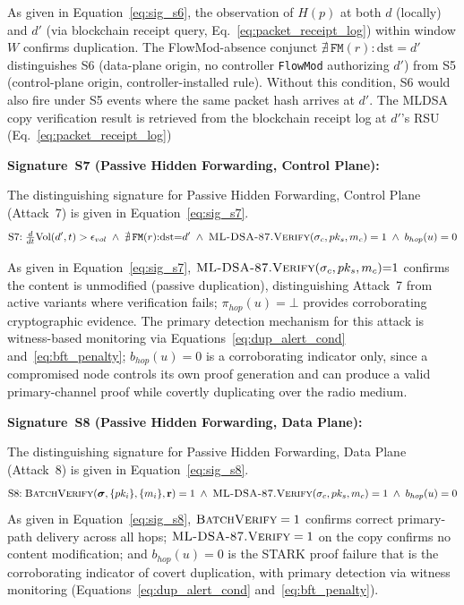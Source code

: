 \documentclass[12pt, a4paper]{report}
\begin{document}
As given in Equation~\eqref{eq:sig_s6}, the
observation of $H(p)$ at both $d$ (locally) and $d'$
(via blockchain receipt query,
Eq.~\ref{eq:packet_receipt_log}) within window $W$
confirms duplication. The \ac{FlowMod}-absence
conjunct $\nexists\,\texttt{FM}(r){:}\text{dst}{=}d'$
distinguishes S6 (data-plane origin, no controller
\texttt{FlowMod} authorizing $d'$) from S5
(control-plane origin, controller-installed rule).
Without this condition, S6 would also fire under S5
events where the same packet hash arrives at $d'$.
The \ac{MLDSA} copy verification result is retrieved
from the blockchain receipt log at $d'$'s \ac{RSU}
(Eq.~\ref{eq:packet_receipt_log})




\textbf{Signature~S7 (Passive Hidden Forwarding, Control Plane):}

The distinguishing signature for Passive Hidden
Forwarding, Control Plane (Attack~7) is given in
Equation~\eqref{eq:sig_s7}.
\begin{equation}
\text{S7:}\;
\tfrac{d}{dt}\text{Vol}(d',t) > \epsilon_{vol}
\;\land\; \nexists\,\texttt{FM}(r){:}\text{dst}{=}d'
\;\land\; \textsc{ML-DSA-87.Verify}(
\sigma_c, pk_s, m_c) = 1
\;\land\; b_{hop}(u) = 0
\label{eq:sig_s7}
\end{equation}

As given in Equation~\eqref{eq:sig_s7},
$\textsc{ML-DSA-87.Verify}(\sigma_c, pk_s, m_c){=}1$
confirms the content is unmodified (passive duplication),
distinguishing Attack~7 from active variants where
verification fails; $\pi_{hop}(u){=}\bot$ provides
corroborating cryptographic evidence. The primary
detection mechanism for this attack is witness-based
monitoring via Equations~\eqref{eq:dup_alert_cond}
and~\eqref{eq:bft_penalty}; $b_{hop}(u){=}0$ is a
corroborating indicator only, since a compromised node
controls its own proof generation and can produce a
valid primary-channel proof while covertly duplicating
over the radio medium.




\textbf{Signature~S8 (Passive Hidden Forwarding, Data Plane):}


The distinguishing signature for Passive Hidden
Forwarding, Data Plane (Attack~8) is given in
Equation~\eqref{eq:sig_s8}.
\begin{equation}
\text{S8:}\;
\textsc{BatchVerify}(\boldsymbol{\sigma},
\{pk_i\}, \{m_i\}, \mathbf{r}) = 1
\;\land\; \textsc{ML-DSA-87.Verify}(
\sigma_c, pk_s, m_c) = 1
\;\land\; b_{hop}(u) = 0
\label{eq:sig_s8}
\end{equation}
As given in Equation~\eqref{eq:sig_s8},
$\textsc{BatchVerify} = 1$ confirms correct
primary-path delivery across all hops;
$\textsc{ML-DSA-87.Verify} = 1$ on the copy
confirms no content modification; and
$b_{hop}(u) = 0$ is the \ac{STARK} proof failure
that is the corroborating indicator of covert
duplication, with primary detection via witness
monitoring (Equations~\eqref{eq:dup_alert_cond}
and~\eqref{eq:bft_penalty}).
\end{document}
